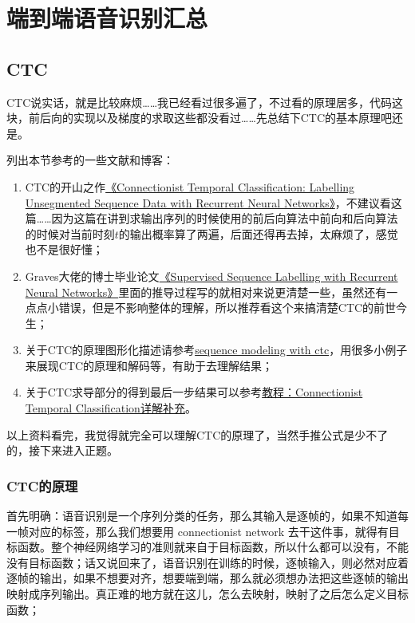 \chapter{端到端语音识别汇总}
\section{CTC}
CTC说实话，就是比较麻烦……我已经看过很多遍了，不过看的原理居多，代码这块，前后向的实现以及梯度的求取这些都没看过……先总结下CTC的基本原理吧还是。

列出本节参考的一些文献和博客：
\begin{enumerate}
  \item CTC的开山之作\href{http://www.cs.toronto.edu/~graves/icml_2006.pdf}{《Connectionist Temporal Classification: Labelling Unsegmented Sequence Data with Recurrent Neural Networks》}，不建议看这篇……因为这篇在讲到求输出序列的时候使用的前后向算法中前向和后向算法的时候对当前时刻$t$的输出概率算了两遍，后面还得再去掉，太麻烦了，感觉也不是很好懂；

  \item Graves大佬的博士毕业论文\href{https://www.cs.toronto.edu/~graves/preprint.pdf}{《Supervised Sequence Labelling with Recurrent Neural Networks》}里面的推导过程写的就相对来说更清楚一些，虽然还有一点点小错误，但是不影响整体的理解，所以推荐看这个来搞清楚CTC的前世今生；

  \item 关于CTC的原理图形化描述请参考\href{https://distill.pub/2017/ctc/}{sequence modeling with ctc}，用很多小例子来展现CTC的原理和解码等，有助于去理解结果；

  \item 关于CTC求导部分的得到最后一步结果可以参考\href{https://blog.csdn.net/w5688414/article/details/77867786}{教程：Connectionist Temporal Classification详解补充}。
\end{enumerate}

以上资料看完，我觉得就完全可以理解CTC的原理了，当然手推公式是少不了的，接下来进入正题。
\subsection{CTC的原理}
首先明确：语音识别是一个序列分类的任务，那么其输入是逐帧的，如果不知道每一帧对应的标签，那么我们想要用 connectionist network 去干这件事，就得有目标函数。整个神经网络学习的准则就来自于目标函数，所以什么都可以没有，不能没有目标函数；话又说回来了，语音识别在训练的时候，逐帧输入，则必然对应着逐帧的输出，如果不想要对齐，想要端到端，那么就必须想办法把这些逐帧的输出映射成序列输出。真正难的地方就在这儿，怎么去映射，映射了之后怎么定义目标函数；

